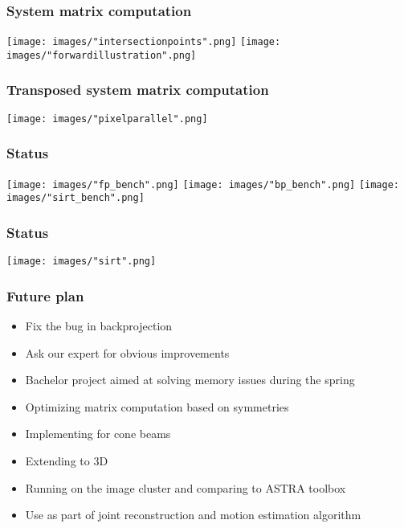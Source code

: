 \documentclass{beamer}
\begin{document}
\begin{frame}
\frametitle{System matrix computation}
\centering
\texttt{[image: images/"intersectionpoints".png]}
\texttt{[image: images/"forwardillustration".png]}
\end{frame}

\begin{frame}
\frametitle{Transposed system matrix computation}
\texttt{[image: images/"pixelparallel".png]}
\end{frame}


\begin{frame}
\frametitle{Status}
\centering
\texttt{[image: images/"fp\_bench".png]}
\texttt{[image: images/"bp\_bench".png]}
\texttt{[image: images/"sirt\_bench".png]}
\end{frame}

\begin{frame}
\frametitle{Status}
\centering
\texttt{[image: images/"sirt".png]}
\end{frame}

\begin{frame}
\frametitle{Future plan}
\begin{itemize}
\item{Fix the bug in backprojection}
\item{Ask our expert for obvious improvements}
\item{Bachelor project aimed at solving memory issues during the spring}
\item{Optimizing matrix computation based on symmetries}
\item{Implementing for cone beams}
\item{Extending to 3D}
\item{Running on the image cluster and comparing to ASTRA toolbox}
\item{Use as part of joint reconstruction and motion estimation algorithm}
\end{itemize}
\end{frame}

 \begin{frame}
 \nocite{*}
 
 
 \end{frame}
\end{document}
